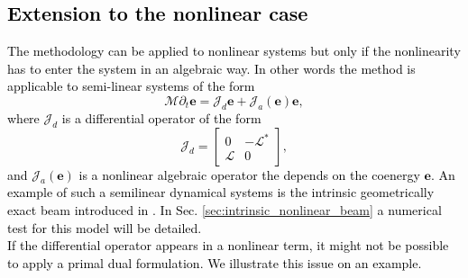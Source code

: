 \documentclass[11pt,a4paper]{article}
\newcommand{\revtwo}[1]{{\textcolor{black}{#1}}}
\begin{document}
\revtwo{
\subsection{Extension to the nonlinear case}\label{sec:nonlinear}
The methodology can be applied to nonlinear systems but only if the nonlinearity has to enter the system in an algebraic way. In other words the method is applicable to semi-linear systems of the form
\begin{equation}
    \mathcal{M}\partial_t \bm{e} = \mathcal{J}_{d}\bm{e} + \mathcal{J}_a(\bm{e})\bm{e},
\end{equation}
where $\mathcal{J}_d$ is a differential operator of the form
\begin{equation}
    \mathcal{J}_d = 
    \begin{bmatrix}
        0 & -\mathcal{L}^* \\
        \mathcal{L} & 0
    \end{bmatrix},
\end{equation}
and $\mathcal{J}_a(\bm{e})$ is a nonlinear algebraic operator the depends on the coenergy $\bm{e}$. An example of such a semilinear dynamical systems is the intrinsic geometrically exact beam introduced in \cite{hodges2003intrinsic}. In Sec. \ref{sec:intrinsic_nonlinear_beam} a numerical test for this model will be detailed. \\
If the differential operator appears in a nonlinear term, it might not be possible to apply a primal dual formulation. 
We illustrate this issue on an example.
}
\end{document}

